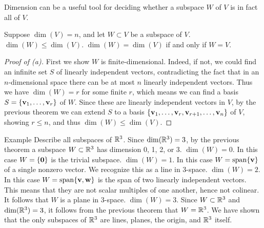 \begin{frame}
Dimension can be a useful tool for deciding whether a subspace $W$ of $V$ is in fact all of $V$. 
\begin{theorem}
Suppose $\dim(V)=n$, and let $W\subset V$ be a subspace of $V$. 
\bb[(a)]
\pause\ii $\dim(W)\leq \dim(V)$. 
\pause\ii $\dim(W)=\dim(V)$ if and only if $W=V$. 
\ee
\end{theorem}
\pause\begin{proof}[Proof of (a)]
First we show $W$ is finite-dimensional. Indeed, if not, we could find an infinite set $S$ of linearly independent vectors, contradicting the fact that in an $n$-dimensional space there can be at most $n$ linearly independent vectors. 
\bpause 
Thus we have $\dim(W)=r$ for some finite $r$, which means we can find a basis $S=\{{\mathbf v}_1,\dots, {\mathbf v}_r\}$ of $W$. Since these are linearly independent vectors in $V$, by the previous theorem we can \alert{extend} $S$ to a basis $\{{\mathbf v}_1,\dots, {\mathbf v}_r,{\mathbf v}_{r+1},\dots,{\mathbf v}_n\}$ of $V$, showing $r\leq n$, and thus $\dim(W)\leq\dim(V)$.   
\end{proof}
\end{frame}
\begin{frame}{Example}
Describe all subspaces of ${\mathbb R}^3$. 
\bpause
Since $\dim({\mathbb R}^3)=3$, by the previous theorem a subspace $W\subset {\mathbb R}^3$ has dimension 0, 1, 2, or 3.
\bpause 
\alert{$\dim(W)=0$.} In this case $W=\{{\mathbf 0}\}$ is the trivial subspace. 
\bpause
\alert{$\dim(W)=1$.} In this case $W=\operatorname{span}\{{\mathbf v}\}$ of a single nonzero vector. We recognize this as a line in 3-space. 
\bpause
\alert{$\dim(W)=2$.} In this case $W=\operatorname{span}\{{\mathbf v}, {\mathbf w}\}$ is the span of two linearly independent vectors. This means that they are not scalar multiples of one another, hence not colinear. It follows that $W$ is a plane in 3-space. 
\bpause
\alert{$\dim(W)=3$.} Since $W\subset{\mathbb R}^3$ and $\dim({\mathbb R}^3)=3$, it follows from the previous theorem that $W={\mathbb R}^3$. 
\bpause We have shown that the only subspaces of ${\mathbb R}^3$ are lines, planes, the origin, and ${\mathbb R}^3$ itself.  

\end{frame}
